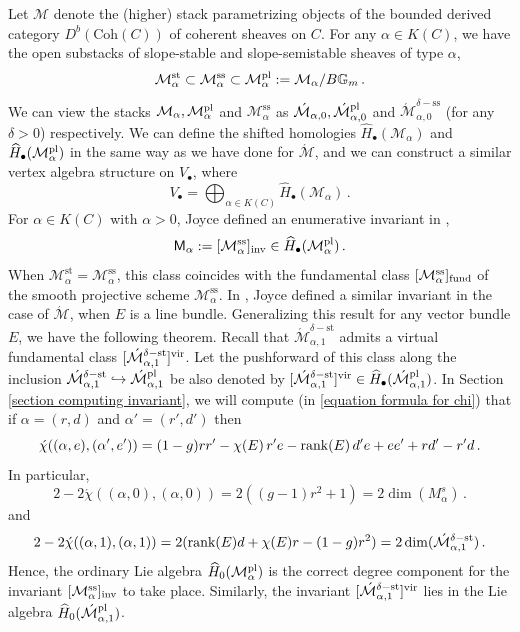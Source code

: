 \documentclass[11pt]{amsart}
\theoremstyle{remark}
\newcommand{\mb}[1]{\mathbb{#1}}
\newcommand{\M}{\mathcal{M}}
\newcommand{\Mdash}{\acute{\mathcal{M}}}
\newcommand{\rk}{\textnormal{rank}}
\newcommand{\wh}[1]{\widehat{#1}}
\newcommand{\vir}[0]{\textnormal{vir}}
\newcommand{\inv}[0]{\textnormal{inv}}
\newcommand{\pl}[0]{\textnormal{pl}}
\newcommand{\sfM}{\mathsf M}
\newcommand{\fund}{\textnormal{fund}}
\renewcommand{\ss}[0]{\text{ss}}
\newcommand{\st}[0]{\text{st}}
\numberwithin{theorem}{section}
\begin{document}
    Let $\M$ denote the (higher) stack parametrizing objects 
    of the bounded derived category $D^b(\text{Coh}(C))$ of coherent sheaves on $C$. 
    For any $\alpha \in K(C)$, we have the open substacks of 
    slope-stable and slope-semistable sheaves of type $\alpha$,
    $$\M^{\st}_\alpha \subset \M^{\ss}_\alpha
    \subset \M^\pl_{\alpha}:= \M_\alpha/B\mb G_m\,.$$
    We can view the stacks $\M_{\alpha}, \M^\pl_{\alpha}$ and $\M^{\ss}_\alpha$
    as $\Mdash_{\alpha,0}, \Mdash^\pl_{\alpha,0}$ 
    and $\Mdash^{\delta-\ss}_{\alpha,0}$ (for any $\delta >0$)
    respectively.
    We can define the shifted homologies $\wh{H}_\bullet(\M_{\alpha})$
    and $\wh{H}_\bullet(\M^\pl_{\alpha})$ in the same way as we have done for $\Mdash$,
    and we can
    construct a similar vertex algebra structure on $V_\bullet$,
    where
    $$V_\bullet = \bigoplus_{\alpha \in K(C)} \wh{H}_\bullet(\M_{\alpha})\,.$$
    For $\alpha \in K(C)$ with $\alpha>0$, Joyce defined an enumerative invariant  in \cite[Theorem 7.63]{Joy21},
    $$ \sfM_\alpha := [\M^{\ss}_\alpha]_\inv \in \wh{H}_\bullet(\M^\pl_{\alpha})\,.$$
    When $\M^{\st}_\alpha = \M^{\ss}_\alpha$, this class coincides 
    with the fundamental class $[\M^{\ss}_\alpha]_{\fund}$
    of the smooth projective scheme $\M^{\ss}_\alpha$.
    In \cite[Theorem 8.24]{Joy21}, Joyce defined a similar invariant
    in the case of $\Mdash$, when $E$ is a line bundle.
    Generalizing this result for any vector bundle $E$,
    we have the following theorem.
    Recall that $\Mdash_{\alpha,1}^{\delta-\st}$ admits a virtual fundamental class $[\Mdash_{\alpha,1}^{\delta-\st}]^\vir$.
    Let the pushforward of this class along the inclusion $\Mdash_{\alpha,1}^{\delta-\st} \hookrightarrow \Mdash_{\alpha,1}^{\pl}$
    be also denoted by $[\Mdash_{\alpha,1}^{\delta-\st}]^\vir \in \wh H_\bullet(\Mdash_{\alpha,1}^{\pl})$.
    In Section \ref{section computing invariant}, we will compute (in \eqref{equation formula for chi})
    that if $\alpha=(r,d)$ and $\alpha'=(r',d')$ then
    \begin{equation*}
        \acute{\chi}((\alpha,e), (\alpha',e')) 
        = (1-g)rr'-\chi(E)\,r'e -\rk(E)\, d'e+ee'+rd'-r'd\,.
    \end{equation*}
    In particular,
    \begin{equation*}
        2-2\acute{\chi}((\alpha,0),(\alpha,0)) =2((g-1)r^2+1) = 2 \dim(M^s_\alpha)\,.
    \end{equation*}
    and
    \begin{equation*}
        2-2\acute{\chi}((\alpha,1),(\alpha,1)) =2(\rk(E)d+\chi(E)r-(1-g)r^2) = 2 \dim(\Mdash_{\alpha,1}^{\delta-\st})\,.
    \end{equation*}
    Hence, the ordinary Lie algebra 
    $\wh{H}_0(\M^\pl_{\alpha})$ is the correct degree component for the invariant $[\M^{\ss}_\alpha]_\inv$ to take place.
    Similarly, the invariant $[\Mdash_{\alpha,1}^{\delta-\st}]^\vir$ 
    lies in the Lie algebra $\wh{H}_0(\Mdash^\pl_{\alpha,1})$.
    
\end{document}
